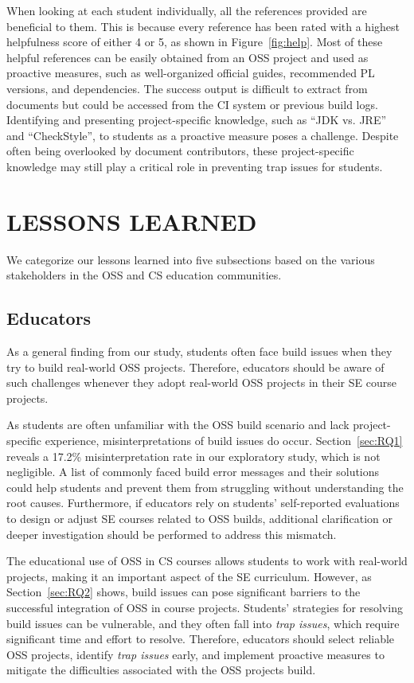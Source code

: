 \documentclass[10pt, conference]{IEEEtran}
\begin{document}
When looking at each student individually, all the references provided are beneficial to them. This is because every reference has been rated with a highest helpfulness score of either 4 or 5, as shown in Figure~\ref{fig:help}. Most of these helpful references can be easily obtained from an OSS project and used as proactive measures, such as well-organized official guides, recommended PL versions, and dependencies. The success output is difficult to extract from documents but could be accessed from the CI system or previous build logs. Identifying and presenting project-specific knowledge, such as ``JDK vs. JRE'' and ``CheckStyle'', to students as a proactive measure poses a challenge. Despite often being overlooked by document contributors, these project-specific knowledge may still play a critical role in preventing trap issues for students.

\section{LESSONS LEARNED}
\label{sec:lesson}
We categorize our lessons learned into five subsections based on the various stakeholders in the OSS and CS education communities.

\subsection{Educators}

As a general finding from our study, students often face build issues when they try to build real-world OSS projects. Therefore, educators should be aware of such challenges whenever they adopt real-world OSS projects in their SE course projects.

As students are often unfamiliar with the OSS build scenario and lack project-specific experience, misinterpretations of build issues do occur. Section~\ref{sec:RQ1} reveals a 17.2\% misinterpretation rate in our exploratory study, which is not negligible. A list of commonly faced build error messages and their solutions could help students and prevent them from struggling without understanding the root causes. Furthermore, if educators rely on students’ self-reported evaluations to design or adjust SE courses related to OSS builds, additional clarification or deeper investigation should be performed to address this mismatch.

The educational use of OSS in CS courses allows students to work with real-world projects, making it an important aspect of the SE curriculum. However, as Section~\ref{sec:RQ2} shows, build issues can pose significant barriers to the successful integration of OSS in course projects. Students’ strategies for resolving build issues can be vulnerable, and they often fall into \textit{trap issues}, which require significant time and effort to resolve. Therefore, educators should select reliable OSS projects, identify \textit{trap issues} early, and implement proactive measures to mitigate the difficulties associated with the OSS projects build.
\end{document}
